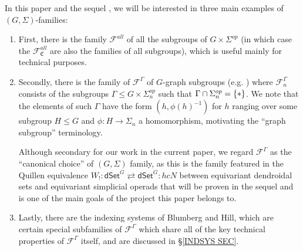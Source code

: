 \documentclass[a4paper,10pt
,draft
]{article}%
\numberwithin{equation}{section}
\numberwithin{figure}{section}
\theoremstyle{definition} %
\newcommand{\F}{\ensuremath{\mathcal F}}
\newcommand{\1}{\ensuremath{\mathbbm 1}}%
\begin{document}
In this paper and the sequel \cite{BP_TAS}, 
we will be interested in three main examples of $(G,\Sigma)$-families:

\begin{enumerate}[label = (\alph*)]
\item First, there is the family $\F^{all}$ of all the subgroups of $G \times \Sigma^{op}$
      (in which case the $\F^{all}_{\mathfrak{C}}$ are also the families of all subgroups), which is useful mainly for technical purposes.
      
\item Secondly, there is the family of $\F^{\Gamma}$
      of $G$-graph subgroups (e.g. \cite[Defn. 6.34]{BP_geo})
      where $\F^{\Gamma}_n$ consists of the subgroups
      $\Gamma \leq G \times \Sigma_n^{op}$
      such that $\Gamma \cap \Sigma_n^{op} = \{\**\}$.
      We note that the elements of such $\Gamma$
      have the form $(h,\phi(h)^{-1})$
      for $h$ ranging over some subgroup $H \leq G$
      and $\phi \colon H \to \Sigma_n$
      a homomorphism,
      motivating the ``graph subgroup'' terminology.
      
      Although secondary for our work in the current paper, we regard $\F^{\Gamma}$ as the ``canonical choice'' of $(G,\Sigma)$ family, 
      as this is the family featured in the Quillen equivalence
      $W_! \colon 
      \mathsf{dSet}^G \rightleftarrows 
      \mathsf{dSet}^G \colon hcN$
      between equivariant dendroidal sets
      and equivariant simplicial operads
      that will be proven in the sequel and is one of the main goals of the project this paper belongs to.
      
\item Lastly, there are the indexing systems of Blumberg and Hill,
      which are certain special subfamilies of $\F^{\Gamma}$
      which share all of the key technical properties of 
      $\F^{\Gamma}$ itself,
      and are discussed in \S \ref{INDSYS SEC}.
\end{enumerate}
\end{document}
